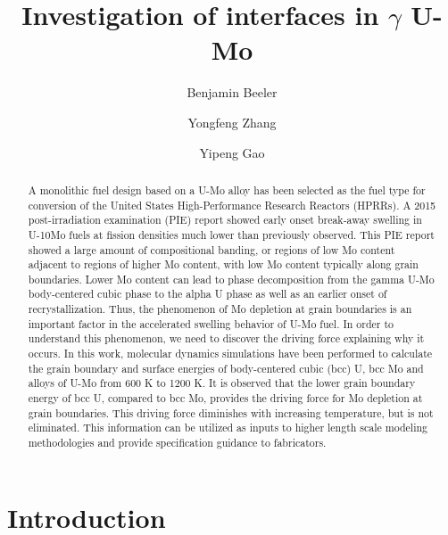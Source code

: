 \documentclass[review]{elsarticle}
\begin{document}
\begin{frontmatter}
\title{Investigation of interfaces in $\gamma$ U-Mo}

\author[inl]{Benjamin Beeler}
\author[inl]{Yongfeng Zhang}
\author[inl]{Yipeng Gao}
\address[inl]{Idaho National Laboratory, Idaho Falls, ID 83415}


\begin{abstract}
A monolithic fuel design based on a U-Mo alloy has been selected as the fuel type for conversion of the United States High-Performance Research Reactors (HPRRs). A 2015 post-irradiation examination (PIE) report showed early onset break-away swelling in U-10Mo fuels at fission densities much lower than previously observed. This PIE report showed a large amount of compositional banding, or regions of low Mo content adjacent to regions of higher Mo content, with low Mo content typically along grain boundaries. Lower Mo content can lead to phase decomposition from the gamma U-Mo body-centered cubic phase to the alpha U phase as well as an earlier onset of recrystallization. Thus, the phenomenon of Mo depletion at grain boundaries is an important factor in the accelerated swelling behavior of U-Mo fuel. In order to understand this phenomenon, we need to discover the driving force explaining why it occurs. In this work, molecular dynamics simulations have been performed to calculate the grain boundary and surface energies of body-centered cubic (bcc) U, bcc Mo and alloys of U-Mo from 600 K to 1200 K. It is observed that the lower grain boundary energy of bcc U, compared to bcc Mo, provides the driving force for Mo depletion at grain boundaries. This driving force diminishes with increasing temperature, but is not eliminated. This information can be utilized as inputs to higher length scale modeling methodologies and provide specification guidance to fabricators.
\end{abstract}
\end{frontmatter}

\linenumbers
\modulolinenumbers[5]

\section{Introduction}
\end{document}

